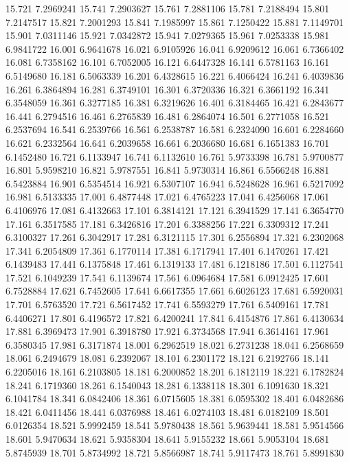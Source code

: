 15.721 7.2969241
15.741 7.2903627
15.761 7.2881106
15.781 7.2188494
15.801 7.2147517
15.821 7.2001293
15.841 7.1985997
15.861 7.1250422
15.881 7.1149701
15.901 7.0311146
15.921 7.0342872
15.941 7.0279365
15.961 7.0253338
15.981 6.9841722
16.001 6.9641678
16.021 6.9105926
16.041 6.9209612
16.061 6.7366402
16.081 6.7358162
16.101 6.7052005
16.121 6.6447328
16.141 6.5781163
16.161 6.5149680
16.181 6.5063339
16.201 6.4328615
16.221 6.4066424
16.241 6.4039836
16.261 6.3864894
16.281 6.3749101
16.301 6.3720336
16.321 6.3661192
16.341 6.3548059
16.361 6.3277185
16.381 6.3219626
16.401 6.3184465
16.421 6.2843677
16.441 6.2794516
16.461 6.2765839
16.481 6.2864074
16.501 6.2771058
16.521 6.2537694
16.541 6.2539766
16.561 6.2538787
16.581 6.2324090
16.601 6.2284660
16.621 6.2332564
16.641 6.2039658
16.661 6.2036680
16.681 6.1651383
16.701 6.1452480
16.721 6.1133947
16.741 6.1132610
16.761 5.9733398
16.781 5.9700877
16.801 5.9598210
16.821 5.9787551
16.841 5.9730314
16.861 6.5566248
16.881 6.5423884
16.901 6.5354514
16.921 6.5307107
16.941 6.5248628
16.961 6.5217092
16.981 6.5133335
17.001 6.4877448
17.021 6.4765223
17.041 6.4256068
17.061 6.4106976
17.081 6.4132663
17.101 6.3814121
17.121 6.3941529
17.141 6.3654770
17.161 6.3517585
17.181 6.3426816
17.201 6.3388256
17.221 6.3309312
17.241 6.3100327
17.261 6.3042917
17.281 6.3121115
17.301 6.2556894
17.321 6.2302068
17.341 6.2054809
17.361 6.1770114
17.381 6.1717941
17.401 6.1470261
17.421 6.1439483
17.441 6.1375848
17.461 6.1319133
17.481 6.1218186
17.501 6.1127541
17.521 6.1049239
17.541 6.1139674
17.561 6.0964684
17.581 6.0912425
17.601 6.7528884
17.621 6.7452605
17.641 6.6617355
17.661 6.6026123
17.681 6.5920031
17.701 6.5763520
17.721 6.5617452
17.741 6.5593279
17.761 6.5409161
17.781 6.4406271
17.801 6.4196572
17.821 6.4200241
17.841 6.4154876
17.861 6.4130634
17.881 6.3969473
17.901 6.3918780
17.921 6.3734568
17.941 6.3614161
17.961 6.3580345
17.981 6.3171874
18.001 6.2962519
18.021 6.2731238
18.041 6.2568659
18.061 6.2494679
18.081 6.2392067
18.101 6.2301172
18.121 6.2192766
18.141 6.2205016
18.161 6.2103805
18.181 6.2000852
18.201 6.1812119
18.221 6.1782824
18.241 6.1719360
18.261 6.1540043
18.281 6.1338118
18.301 6.1091630
18.321 6.1041784
18.341 6.0842406
18.361 6.0715605
18.381 6.0595302
18.401 6.0482686
18.421 6.0411456
18.441 6.0376988
18.461 6.0274103
18.481 6.0182109
18.501 6.0126354
18.521 5.9992459
18.541 5.9780438
18.561 5.9639441
18.581 5.9514566
18.601 5.9470634
18.621 5.9358304
18.641 5.9155232
18.661 5.9053104
18.681 5.8745939
18.701 5.8734992
18.721 5.8566987
18.741 5.9117473
18.761 5.8991830
